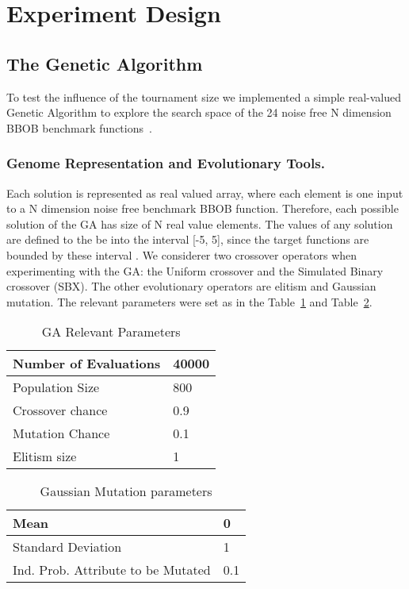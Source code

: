 \section{Experiment Design}

\subsection{The Genetic Algorithm}\label{sec:proposed:ga}

To test the influence of the tournament size we implemented a simple real-valued Genetic Algorithm to explore the search space of the 24 noise free N dimension BBOB benchmark functions~\cite{hansen2010real}.

\subsubsection*{Genome Representation and Evolutionary Tools.}
Each solution is represented as real valued array, where each element is one input to a N dimension noise free benchmark BBOB function. Therefore, each possible solution of the GA has size of N real value elements. The values of any solution are defined to the be into the interval [-5, 5], since the target functions are bounded by these interval	. We considerer two crossover operators when experimenting with the GA: the Uniform crossover and the Simulated Binary crossover (SBX). The other evolutionary operators are elitism and Gaussian mutation. The relevant parameters were set as in the Table~\ref{relevant_par} and Table~\ref{gaussian_par}.

\vspace{3mm}
\begin{table}[!ht]
	\centering
	\begin{tabular}{|l|l|}
	\hline
	Number of Evaluations & 40000 \\ \hline
	Population Size &  800		\\ \hline
	Crossover chance 	& 0.9	\\ \hline
	Mutation Chance 	& 0.1	\\ \hline		
	Elitism size 		& 1		\\ \hline		
	\end{tabular}
	\caption{GA Relevant Parameters}
	\label{relevant_par}
\end{table}
	\vspace{-2mm}
%
\begin{table}[!ht]
	\centering
	\begin{tabular}{|l|l|}
	\hline
		Mean & 0 \\ \hline		
		Standard Deviation & 1 \\ \hline		
		Ind. Prob. Attribute to be Mutated &  0.1 \\ \hline		
	\end{tabular}
	\caption{Gaussian Mutation parameters}
	\label{gaussian_par}
\end{table}

